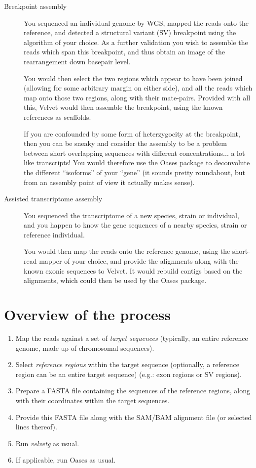 \documentclass[12pt]{article}
\begin{document}
\begin{description}
\item[Breakpoint assembly]

You sequenced an individual genome by WGS, mapped the reads onto the reference, and detected a structural variant (SV) breakpoint using the algorithm of your choice.  As a further validation you wish to assemble the reads which span this breakpoint, and thus obtain an image of the rearrangement down basepair level.

You would then select the two regions which appear to have been joined (allowing for some arbitrary margin on either side), and all the reads which map onto those two regions, along with their mate-pairs. Provided with all this, Velvet would then assemble the breakpoint, using the known references as scaffolds.

If you are confounded by some form of heterzygocity at the breakpoint, then you can be sneaky and consider the assembly to be a problem between short
overlapping sequences with different concentrations... a lot like transcripts! You would therefore use the Oases package to deconvolute the different
``isoforms'' of your ``gene'' (it sounds pretty roundabout, but from an assembly point of view it actually makes sense).

\item[Assisted transcriptome assembly] 

You sequenced the transcriptome of a new species, strain or individual, and you happen to know the gene sequences of a nearby species, strain or reference individual.

You would then map the reads onto the reference genome, using the short-read mapper of your choice, and provide the alignments along with the known exonic sequences to Velvet. It would rebuild contigs based on the alignments, which could then be used by the Oases package.
 
\end{description}

\section{Overview of the process}

\begin{enumerate}
\item Map the reads against a set of \emph{target sequences} (typically, an entire reference genome, made up of chromosomal sequences).
\item Select \emph{reference regions} within the target sequence (optionally, a reference region can be an entire target sequence) (e.g.: exon regions or SV regions).
\item Prepare a FASTA file containing the sequences of the reference regions, along with their coordinates within the target sequences. 
\item Provide this FASTA file along with the SAM/BAM alignment file (or selected lines thereof).
\item Run \emph{velvetg} as usual.
\item If applicable, run Oases as usual.
\end{enumerate}
\end{document}
